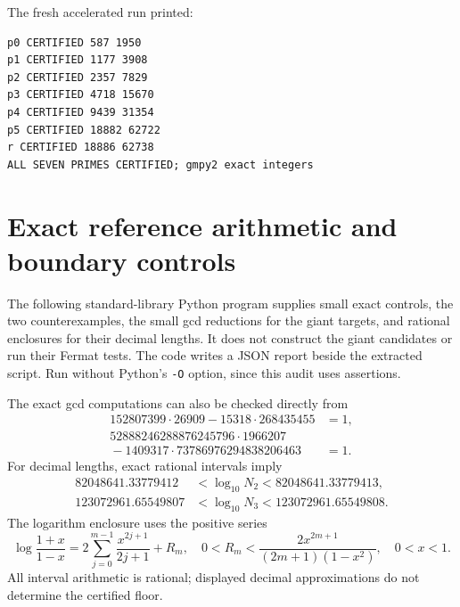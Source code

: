 \documentclass[11pt,a4paper]{article}
\theoremstyle{definition}
\begin{document}

The fresh accelerated run printed:
\begin{lstlisting}[numbers=none]
p0 CERTIFIED 587 1950
p1 CERTIFIED 1177 3908
p2 CERTIFIED 2357 7829
p3 CERTIFIED 4718 15670
p4 CERTIFIED 9439 31354
p5 CERTIFIED 18882 62722
r CERTIFIED 18886 62738
ALL SEVEN PRIMES CERTIFIED; gmpy2 exact integers
\end{lstlisting}

\clearpage
\section{Exact reference arithmetic and boundary controls}
\label{app:reference}

The following standard-library Python program supplies small exact controls,
the two counterexamples, the small gcd reductions for the giant targets,
and rational enclosures for their decimal lengths. It does not construct
the giant candidates or run their Fermat tests. The code writes a JSON
report beside the extracted script. Run without Python's \texttt{-O}
option, since this audit uses assertions.

The exact gcd computations can also be checked directly from
\begin{align*}
152807399\cdot26909-15318\cdot268435455&=1,\\
52888246288876245796\cdot1966207\qquad&\\[-8pt]
{}-1409317\cdot73786976294838206463&=1.
\end{align*}
For decimal lengths, exact rational intervals imply
\begin{align*}
82048641.33779412&<\log_{10}N_2<82048641.33779413,\\
123072961.65549807&<\log_{10}N_3<123072961.65549808.
\end{align*}
The logarithm enclosure uses the positive series
\[
\log\frac{1+x}{1-x}=2\sum_{j=0}^{m-1}\frac{x^{2j+1}}{2j+1}+R_m,
\quad 0<R_m<\frac{2x^{2m+1}}{(2m+1)(1-x^2)},\quad 0<x<1.
\]
All interval arithmetic is rational; displayed decimal approximations do
not determine the certified floor.
\end{document}
